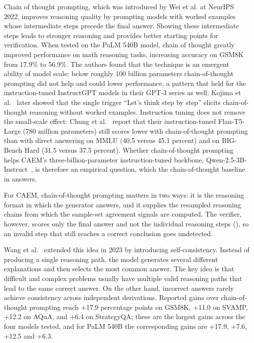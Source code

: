 Chain of thought prompting, which was introduced by Wei et al. \cite{wei2022chain} at NeurIPS 2022, improves reasoning quality by prompting models with worked examples whose intermediate steps precede the final answer. Showing these intermediate steps leads to stronger reasoning and provides better starting points for verification. When tested on the PaLM 540B model, chain of thought greatly improved performance on math reasoning tasks, increasing accuracy on GSM8K from 17.9\% to 56.9\%. The authors found that the technique is an emergent ability of model scale: below roughly 100 billion parameters chain-of-thought prompting did not help and could lower performance, a pattern that held for the instruction-tuned InstructGPT models in their GPT-3 series as well. Kojima et al.~\cite{kojima2022large} later showed that the single trigger ``Let's think step by step'' elicits chain-of-thought reasoning without worked examples. Instruction tuning does not remove the small-scale effect: Chung et al.\ \cite{JMLR:v25:23-0870} report that their instruction-tuned Flan-T5-Large (780 million parameters) still scores lower with chain-of-thought prompting than with direct answering on MMLU (40.5 versus 45.1 percent) and on BIG-Bench Hard (31.5 versus 37.5 percent). Whether chain-of-thought prompting helps CAEM's three-billion-parameter instruction-tuned backbone, Qwen-2.5-3B-Instruct~\cite{qwen25}, is therefore an empirical question, which the chain-of-thought baseline in  answers.

For CAEM, chain-of-thought prompting matters in two ways: it is the reasoning format in which the generator answers, and it supplies the resampled reasoning chains from which the sample-set agreement signals are computed. The verifier, however, scores only the final answer and not the individual reasoning steps (), so an invalid step that still reaches a correct conclusion goes undetected.

Wang et al.\ \cite{wang2023selfconsistency} extended this idea in 2023 by introducing self-consistency. Instead of producing a single reasoning path, the model generates several different explanations and then selects the most common answer. The key idea is that difficult and complex problems usually have multiple valid reasoning paths that lead to the same correct answer. On the other hand, incorrect answers rarely achieve consistency across independent derivations. Reported gains over chain-of-thought prompting reach +17.9 percentage points on GSM8K, +11.0 on SVAMP, +12.2 on AQuA, and +6.4 on StrategyQA; these are the largest gains across the four models tested, and for PaLM 540B the corresponding gains are +17.9, +7.6, +12.5 and +6.3.

